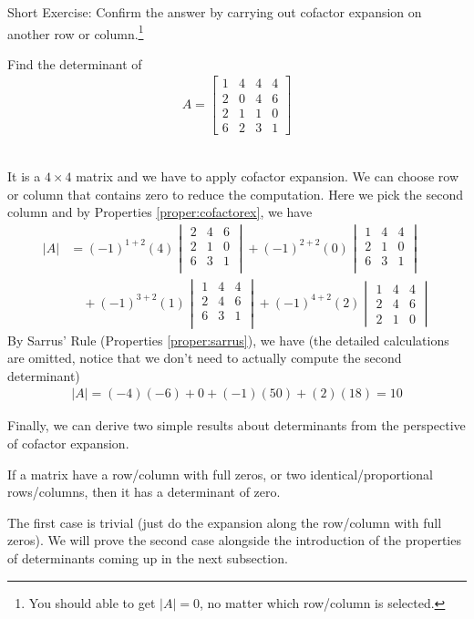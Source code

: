 Short Exercise: Confirm the answer by carrying out cofactor expansion on another row or column.\footnote{You should able to get $|A| = 0$, no matter which row/column is selected.}
\begin{exmp}
\label{exmp:4x4det}
Find the determinant of
\begin{align*}
A = 
\begin{bmatrix}
1 & 4 & 4 & 4 \\
2 & 0 & 4 & 6 \\
2 & 1 & 1 & 0 \\
6 & 2 & 3 & 1
\end{bmatrix}
\end{align*}\
\end{exmp}
\begin{solution}
It is a $4 \times 4$ matrix and we have to apply cofactor expansion. We can choose row or column that contains zero to reduce the computation. Here we pick the second column and by Properties \ref{proper:cofactorex}, we have
\begin{align*}
|A| &= (-1)^{1+2}(4)
\begin{vmatrix}
2 & 4 & 6 \\
2 & 1 & 0 \\
6 & 3 & 1 \\
\end{vmatrix}
+ (-1)^{2+2}(0)
\begin{vmatrix}
1 & 4 & 4 \\
2 & 1 & 0 \\
6 & 3 & 1 \\
\end{vmatrix} \\
&\quad + (-1)^{3+2}(1) 
\begin{vmatrix}
1 & 4 & 4 \\
2 & 4 & 6 \\
6 & 3 & 1 \\
\end{vmatrix} 
+ (-1)^{4+2}(2)
\begin{vmatrix}
1 & 4 & 4 \\
2 & 4 & 6 \\
2 & 1 & 0
\end{vmatrix} 
\end{align*}
By Sarrus' Rule (Properties \ref{proper:sarrus}), we have (the detailed calculations are omitted, notice that we don't need to actually compute the second determinant) 
\begin{align*}
|A| = (-4)(-6) + 0 + (-1)(50) + (2)(18) = 10
\end{align*}
\end{solution}
Finally, we can derive two simple results about determinants from the perspective of cofactor expansion.
\begin{proper}
\label{proper:zerodet}
If a matrix have a row/column with full zeros, or two identical/proportional rows/columns, then it has a determinant of zero.
\end{proper}
The first case is trivial (just do the expansion along the row/column with full zeros). We will prove the second case alongside the introduction of the properties of determinants coming up in the next subsection.

